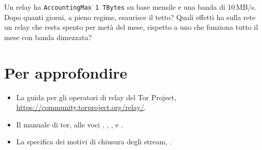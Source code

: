 \begin{esercizio}[3]\label{es:22-accounting}
Un relay ha \texttt{AccountingMax 1 TBytes} su base mensile e una banda di 10\,MB/s. Dopo quanti giorni, a pieno regime, esaurisce il tetto? Quali effetti ha sulla rete un relay che resta spento per metà del mese, rispetto a uno che funziona tutto il mese con banda dimezzata?
\end{esercizio}

\section*{Per approfondire}
\begin{itemize}
  \item La guida per gli operatori di relay del Tor Project, \url{https://community.torproject.org/relay/}.
  \item \begin{sloppypar}Il manuale di tor, alle voci , ,
        ,  e .\end{sloppypar}
  \item La specifica dei motivi di chiusura degli stream, .
\end{itemize}
